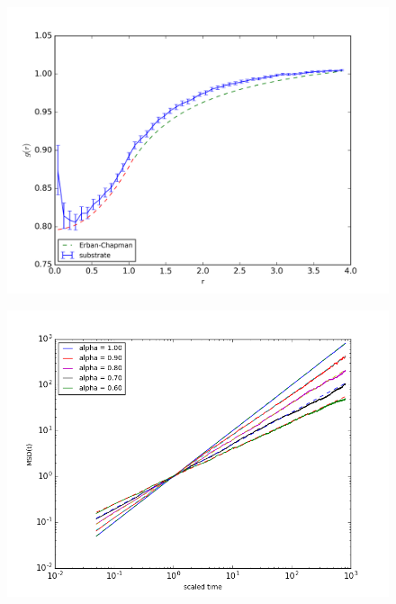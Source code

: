 \documentclass[
  a4paper,BCOR10mm,oneside,
  bibtotoc,idxtotoc,
  headsepline,footsepline,%
  fleqn,openbib
]{scrbook}
\begin{document}
\begin{figure}[h!]
  \centering
  \includegraphics[width=\textwidth]{./data/chapman-limit-radial.png}
  \captionsetup{width=\linewidth}
  \label{fig:diffusion_limit-Erban-Chapmann_radial}
\end{figure}

\begin{figure}[h!]
  \centering
  \includegraphics[width=\textwidth]{./data/differentalphamsdrevreaddy.png}
  \captionsetup{width=\linewidth}
  \label{fig:differentalpharevreaddymsd}
\end{figure}
\end{document}
